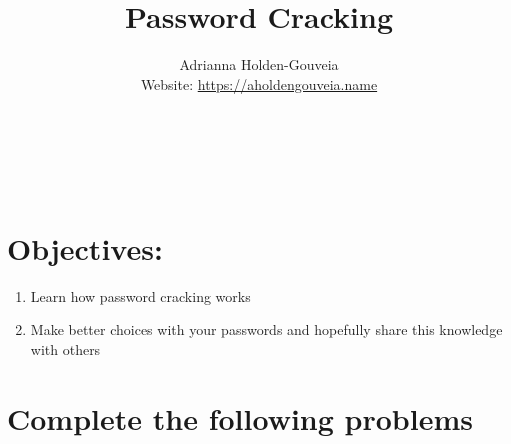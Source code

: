 \documentclass[12pt]{article}
\title{Password Cracking}
\author{
        Adrianna Holden-Gouveia \\
        Website: \url{https://aholdengouveia.name}\\ 
        \date{\vspace{-5ex}}
        \faLinkedin{: aholdengouveia} \\
        \faGithub {: aholdengouveia} \\
        \faTwitter {: aholdengouveia} \\
        }
\begin{document}
    

\maketitle


\section*{Objectives:}
\begin{enumerate}
    \item Learn how password cracking works    
    \item Make better choices with your passwords and hopefully share this knowledge with others
\end{enumerate}
\section*{Complete the following problems}

\end{document}
